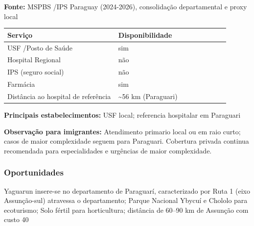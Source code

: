 \textbf{Fonte:} MSPBS /\allowbreak  IPS Paraguay (2024-2026), consolidação
departamental e proxy local

{\def\LTcaptype{none} %
\begin{longtable}{@{}>{\raggedright\arraybackslash}p{0.45\linewidth} >{\raggedright\arraybackslash}p{0.45\linewidth}@{}}
\toprule\noalign{}
Serviço & Disponibilidade \\
\midrule\noalign{}
\endhead
\bottomrule\noalign{}
\endlastfoot
USF /\allowbreak  Posto de Saúde & sim \\
Hospital Regional & não \\
IPS (seguro social) & não \\
Farmácia & sim \\
Distância ao hospital de referência & \textasciitilde56 km
(Paraguari) \\
\end{longtable}
}

\textbf{Principais estabelecimentos:} USF local; referencia hospitalar
em Paraguari

\textbf{Observação para imigrantes:} Atendimento primario local ou em
raio curto; casos de maior complexidade seguem para Paraguari. Cobertura
privada continua recomendada para especialidades e urgências de maior
complexidade.
\newpage

\subsubsection*{Oportunidades}\label{oport-yaguarun-0917}
Yaguarun insere-se no departamento de Paraguarí, caracterizado por Ruta 1 (eixo Assunção-sul) atravessa o departamento; Parque Nacional Ybycuí e Chololo para ecoturismo; Solo fértil para horticultura; distância de 60–90 km de Assunção com custo 40%

